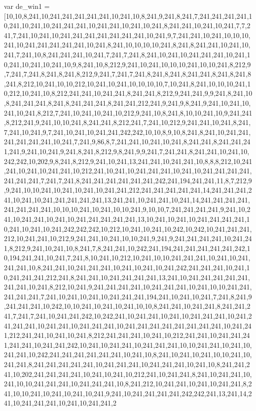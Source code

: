 var de_win1 = [10,10,8,241,10,241,241,241,241,241,10,241,10,8,241,9,241,8,241,7,241,241,241,241,10,241,10,241,10,241,241,241,10,241,241,10,241,10,241,8,241,241,10,241,10,241,7,7,241,7,241,10,241,10,241,241,241,241,241,241,241,10,241,9,7,241,241,10,241,10,10,10,241,10,241,241,241,241,241,10,241,8,241,10,10,10,10,241,8,241,8,241,241,10,241,10,241,7,241,10,8,241,241,241,10,241,7,241,7,241,8,241,10,241,10,241,241,241,10,241,10,241,10,241,10,241,10,9,8,241,10,8,212,9,241,10,241,10,10,10,241,10,10,241,8,212,9,7,241,7,241,8,241,8,241,8,212,9,241,7,241,7,241,8,241,8,241,8,241,241,8,241,8,241,8,241,8,212,10,241,10,10,212,10,241,10,241,10,10,10,10,7,10,241,8,241,10,10,10,241,10,212,10,241,10,8,212,241,241,10,241,241,8,241,241,8,212,9,241,241,9,9,241,8,241,10,8,241,241,241,8,241,8,241,241,241,8,241,241,212,241,9,241,9,8,241,9,241,10,241,10,241,10,241,8,212,7,241,10,241,10,241,10,212,9,241,10,8,241,8,10,10,241,10,9,241,241,8,212,241,9,241,10,10,241,8,241,241,8,212,241,7,241,10,212,9,241,241,10,241,8,241,7,241,10,241,9,7,241,10,241,10,241,241,242,242,10,10,8,9,10,8,241,8,241,10,241,241,241,241,241,241,10,241,7,241,9,86,8,7,241,241,10,241,10,241,8,241,241,8,241,241,241,241,9,241,10,241,9,241,8,241,8,212,9,8,241,9,9,241,7,241,241,8,241,241,10,241,10,242,242,10,202,9,8,241,8,212,9,241,10,241,13,241,241,10,241,241,10,8,8,8,212,10,241,241,10,241,10,241,241,10,212,241,10,241,10,241,241,241,10,241,10,241,241,241,241,241,241,241,7,241,7,241,8,241,241,241,241,241,241,242,241,194,241,241,11,8,7,212,9,9,241,10,10,241,10,241,10,241,10,241,241,212,241,241,241,241,241,14,241,241,241,241,10,241,10,241,241,241,241,241,13,241,241,10,241,241,10,241,14,241,241,241,241,241,241,241,241,10,10,10,241,10,241,10,10,241,9,10,10,7,241,241,241,241,9,241,10,241,10,241,241,10,241,10,241,241,241,241,241,13,10,241,10,241,10,241,241,241,241,10,241,10,241,10,241,242,242,242,10,212,10,241,10,241,10,242,10,242,10,241,241,241,212,10,241,241,10,212,9,241,241,10,241,10,10,241,9,241,9,241,241,241,241,10,241,241,8,212,9,241,10,241,10,8,241,7,8,241,241,10,242,241,194,241,241,241,241,241,242,10,194,241,241,10,241,7,241,8,10,241,10,212,10,241,10,10,241,241,241,10,241,10,241,241,241,10,8,241,241,10,241,241,241,10,241,10,241,10,241,242,241,241,241,10,241,10,241,241,241,212,241,8,241,241,10,241,241,241,241,13,241,10,241,241,241,241,241,241,241,10,241,8,212,10,241,9,241,241,241,241,10,241,241,241,10,241,10,10,241,241,241,241,241,7,241,10,241,10,241,10,241,241,241,194,241,10,241,10,241,7,241,8,241,9,241,241,241,10,242,10,10,241,10,241,10,241,10,10,8,241,241,10,241,241,8,241,241,241,7,241,7,241,10,241,241,242,10,242,241,10,241,241,10,241,10,241,241,241,10,241,241,241,241,10,241,241,10,241,241,241,10,241,241,241,241,241,241,241,241,10,241,241,212,241,241,10,241,10,241,8,212,241,241,241,10,241,10,212,241,241,10,241,241,241,241,241,10,241,241,242,10,241,10,241,241,10,241,241,241,10,10,241,241,10,241,10,241,241,10,242,241,241,241,241,241,241,10,241,10,8,241,10,241,10,241,10,10,241,10,241,241,8,241,241,241,241,241,10,241,241,241,10,241,241,241,10,241,10,8,241,241,241,10,202,241,241,241,241,10,241,10,241,10,212,241,10,241,241,8,241,10,241,241,10,241,10,10,241,241,241,10,241,241,241,10,8,241,212,10,241,241,10,241,10,241,241,8,241,10,10,241,10,241,10,241,10,241,9,241,10,241,241,241,241,242,242,241,13,241,14,241,10,241,241,241,10,241,10,241,241,2